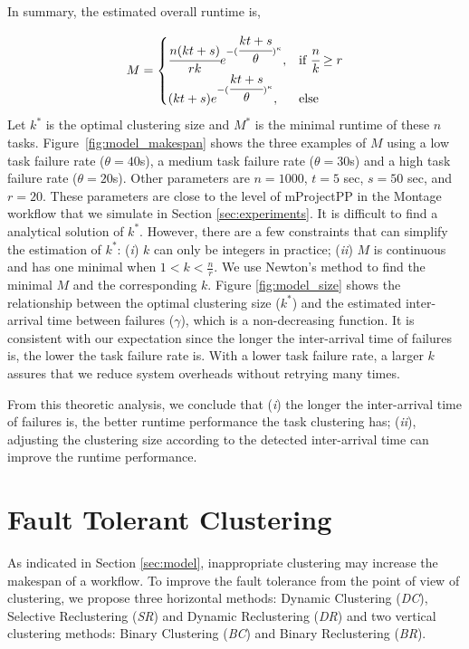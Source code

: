 \documentclass{IOS-Book-Article}
\begin{document}
In summary, the estimated overall runtime is, 

\begin{equation} 
\label{eq:jfm}
M=
\begin{cases}
\cfrac{n(kt+s)}{rk}{e^{-(\cfrac{kt+s}{\theta})^{\kappa}}}, & \text{if } \cfrac{n}{k}\geq r \\
(kt+s){e^{-(\cfrac{kt+s}{\theta})^{\kappa}}}, & \text{else}
\end{cases}
\end{equation}
Let $k^*$ is the optimal clustering size and $M^*$ is the minimal runtime of these $n$ tasks.  Figure~\ref{fig:model_makespan} shows the three examples of $M$ using a low task failure rate ($\theta=40$s), a medium task failure rate ($\theta=30$s) and a high task failure rate ($\theta=20$s). Other parameters are $n=1000$, $t=5$ sec, $s=50$ sec, and $r=20$. These parameters are close to the level of mProjectPP in the Montage workflow that we simulate in Section \ref{sec:experiments}. It is difficult to find a analytical solution of $k^*$. However, there are a few constraints that can simplify the estimation of $k^*$: (\emph{i}) $k$ can only be integers in practice; (\emph{ii}) $M$ is continuous and has one minimal when $\displaystyle 1<k<\frac{n}{r}$. We use Newton's method to find the minimal $M$ and the corresponding $k$. Figure \ref{fig:model_size} shows the relationship between the optimal clustering size ($k^*$) and the estimated inter-arrival time between failures ($\gamma$), which is a non-decreasing function. It is consistent with our expectation since the longer the inter-arrival time of failures is, the lower the task failure rate is. With a lower task failure rate, a larger $k$ assures that we reduce system overheads without retrying many times.  



From this theoretic analysis, we conclude that (\emph{i}) the longer the inter-arrival time of failures is, the better runtime performance the task clustering has; (\emph{ii}), adjusting the clustering size according to the detected inter-arrival time can improve the runtime performance. 

\section{Fault Tolerant Clustering}
\label{sec:clustering}

As indicated in Section \ref{sec:model}, inappropriate clustering may increase the makespan of a workflow. To improve the fault tolerance from the point of view of clustering, we propose three horizontal methods: Dynamic Clustering (\emph{DC}), Selective Reclustering (\emph{SR}) and Dynamic Reclustering (\emph{DR}) and two vertical clustering methods: Binary Clustering (\emph{BC}) and Binary Reclustering (\emph{BR}). 
\end{document}
